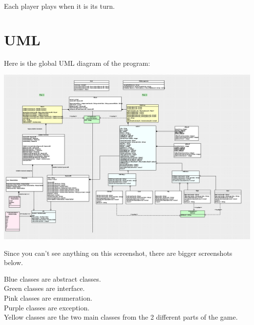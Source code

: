Each player plays when it is its turn.

\section{UML}

Here is the global UML diagram of the program:

\includegraphics[width=450pt]{../../Images/UMLdiagramme.png}

Since you can't see anything on this screenshot, there are bigger screenshots below.

Blue classes are abstract classes.\\
Green classes are interface.\\
Pink classes are enumeration.\\
Purple classes are exception.\\
Yellow classes are the two main classes from the 2 different parts of the game.\\

